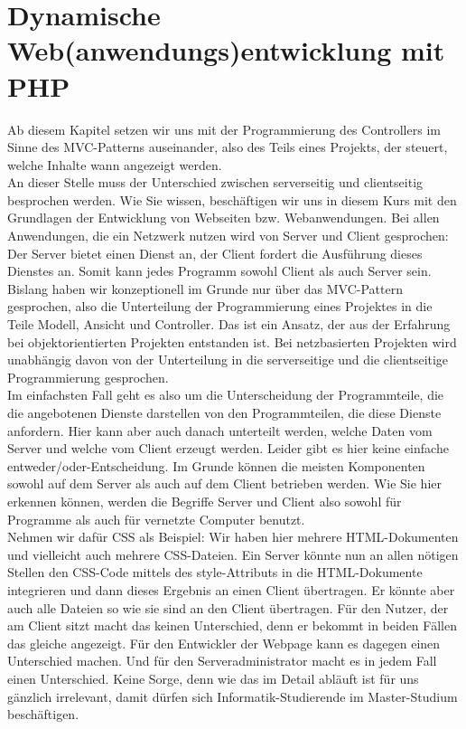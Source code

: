 \chapter[Dynamische Webentwicklung]{Dynamische Web(anwendungs)entwicklung mit PHP}

Ab diesem Kapitel setzen wir uns mit der Programmierung des Controllers im Sinne des MVC-Patterns auseinander, also des Teils eines Projekts, der steuert, welche Inhalte wann angezeigt werden.\\


An dieser Stelle muss der Unterschied zwischen serverseitig und clientseitig besprochen werden. Wie Sie wissen, beschäftigen wir uns in diesem Kurs mit den Grundlagen der Entwicklung von Webseiten bzw. Webanwendungen. Bei allen Anwendungen, die ein Netzwerk nutzen wird von Server und Client gesprochen: Der Server bietet einen Dienst an, der Client fordert die Ausführung dieses Dienstes an. Somit kann jedes Programm sowohl Client als auch Server sein.\\


Bislang haben wir konzeptionell im Grunde nur über das MVC-Pattern gesprochen, also die Unterteilung der Programmierung eines Projektes in die Teile Modell, Ansicht und Controller. Das ist ein Ansatz, der aus der Erfahrung bei objektorientierten Projekten entstanden ist. Bei netzbasierten Projekten wird unabhängig davon von der Unterteilung in die serverseitige und die clientseitige Programmierung gesprochen.\\


Im einfachsten Fall geht es also um die Unterscheidung der Programmteile, die die angebotenen Dienste darstellen von den Programmteilen, die diese Dienste anfordern. Hier kann aber auch danach unterteilt werden, welche Daten vom Server und welche vom Client erzeugt werden. Leider gibt es hier keine einfache entweder/oder-Entscheidung. Im Grunde können die meisten Komponenten sowohl auf dem Server als auch auf dem Client betrieben werden. Wie Sie hier erkennen können, werden die Begriffe Server und Client also sowohl für Programme als auch für vernetzte Computer benutzt.\\


Nehmen wir dafür CSS als Beispiel: Wir haben hier mehrere HTML-Dokumenten und vielleicht auch mehrere CSS-Dateien. Ein Server könnte nun an allen nötigen Stellen den CSS-Code mittels des style-Attributs in die HTML-Dokumente integrieren und dann dieses Ergebnis an einen Client übertragen. Er könnte aber auch alle Dateien so wie sie sind an den Client übertragen. Für den Nutzer, der am Client sitzt macht das keinen Unterschied, denn er bekommt in beiden Fällen das gleiche angezeigt. Für den Entwickler der Webpage kann es dagegen einen Unterschied machen. Und für den Serveradministrator macht es in jedem Fall einen Unterschied. Keine Sorge, denn wie das im Detail abläuft ist für uns gänzlich irrelevant, damit dürfen sich Informatik-Studierende im Master-Studium beschäftigen.\\


